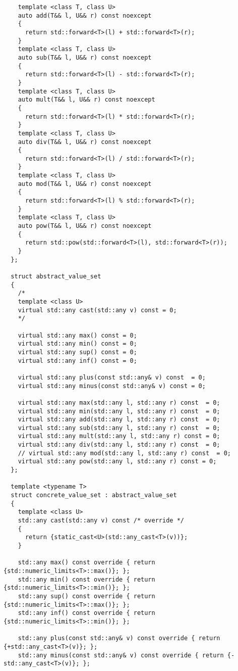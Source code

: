 \begin{verbatim}
    template <class T, class U>
    auto add(T&& l, U&& r) const noexcept
    {
      return std::forward<T>(l) + std::forward<T>(r);
    }
    template <class T, class U>
    auto sub(T&& l, U&& r) const noexcept
    {
      return std::forward<T>(l) - std::forward<T>(r);
    }
    template <class T, class U>
    auto mult(T&& l, U&& r) const noexcept
    {
      return std::forward<T>(l) * std::forward<T>(r);
    }
    template <class T, class U>
    auto div(T&& l, U&& r) const noexcept
    {
      return std::forward<T>(l) / std::forward<T>(r);
    }
    template <class T, class U>
    auto mod(T&& l, U&& r) const noexcept
    {
      return std::forward<T>(l) % std::forward<T>(r);
    }
    template <class T, class U>
    auto pow(T&& l, U&& r) const noexcept
    {
      return std::pow(std::forward<T>(l), std::forward<T>(r));
    }
  };

  struct abstract_value_set
  {
    /*
    template <class U>
    virtual std::any cast(std::any v) const = 0;
    */

    virtual std::any max() const = 0;
    virtual std::any min() const = 0;
    virtual std::any sup() const = 0;
    virtual std::any inf() const = 0;

    virtual std::any plus(const std::any& v) const  = 0;
    virtual std::any minus(const std::any& v) const = 0;

    virtual std::any max(std::any l, std::any r) const  = 0;
    virtual std::any min(std::any l, std::any r) const  = 0;
    virtual std::any add(std::any l, std::any r) const  = 0;
    virtual std::any sub(std::any l, std::any r) const  = 0;
    virtual std::any mult(std::any l, std::any r) const = 0;
    virtual std::any div(std::any l, std::any r) const  = 0;
    // virtual std::any mod(std::any l, std::any r) const  = 0;
    virtual std::any pow(std::any l, std::any r) const = 0;
  };

  template <typename T>
  struct concrete_value_set : abstract_value_set
  {
    template <class U>
    std::any cast(std::any v) const /* override */
    {
      return {static_cast<U>(std::any_cast<T>(v))};
    }

    std::any max() const override { return {std::numeric_limits<T>::max()}; };
    std::any min() const override { return {std::numeric_limits<T>::min()}; };
    std::any sup() const override { return {std::numeric_limits<T>::max()}; };
    std::any inf() const override { return {std::numeric_limits<T>::min()}; };

    std::any plus(const std::any& v) const override { return {+std::any_cast<T>(v)}; };
    std::any minus(const std::any& v) const override { return {-std::any_cast<T>(v)}; };


\end{verbatim}
